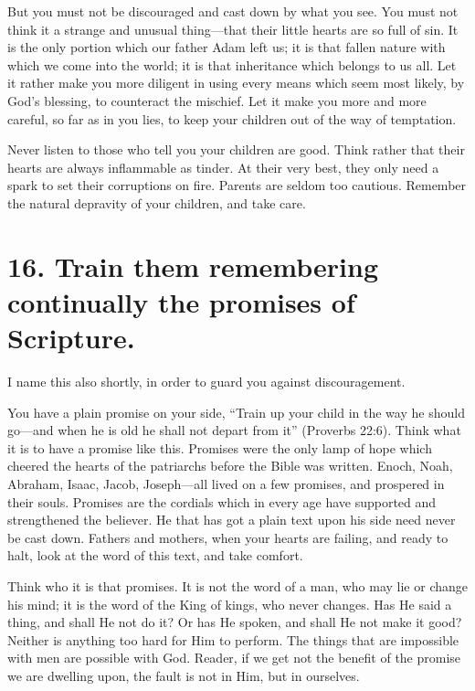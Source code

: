 \documentclass[
]{book}
\begin{document}
But you must not be discouraged and cast down by what you see. You must not think it a strange and unusual thing---that their little hearts are so full of sin. It is the only portion which our father Adam left us; it is that fallen nature with which we come into the world; it is that inheritance which belongs to us all. Let it rather make you more diligent in using every means which seem most likely, by God's blessing, to counteract the mischief. Let it make you more and more careful, so far as in you lies, to keep your children out of the way of temptation.

Never listen to those who tell you your children are good. Think rather that their hearts are always inflammable as tinder. At their very best, they only need a spark to set their corruptions on fire. Parents are seldom too cautious. Remember the natural depravity of your children, and take care.

\hypertarget{train-them-remembering-continually-the-promises-of-scripture.}{%
\section*{16. Train them remembering continually the promises of Scripture.}\label{train-them-remembering-continually-the-promises-of-scripture.}}

I name this also shortly, in order to guard you against discouragement.

You have a plain promise on your side, ``Train up your child in the way he should go---and when he is old he shall not depart from it'' (Proverbs 22:6). Think what it is to have a promise like this. Promises were the only lamp of hope which cheered the hearts of the patriarchs before the Bible was written. Enoch, Noah, Abraham, Isaac, Jacob, Joseph---all lived on a few promises, and prospered in their souls. Promises are the cordials which in every age have supported and strengthened the believer. He that has got a plain text upon his side need never be cast down. Fathers and mothers, when your hearts are failing, and ready to halt, look at the word of this text, and take comfort.

Think who it is that promises. It is not the word of a man, who may lie or change his mind; it is the word of the King of kings, who never changes. Has He said a thing, and shall He not do it? Or has He spoken, and shall He not make it good? Neither is anything too hard for Him to perform. The things that are impossible with men are possible with God. Reader, if we get not the benefit of the promise we are dwelling upon, the fault is not in Him, but in ourselves.
\end{document}
